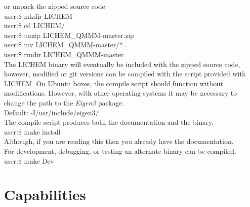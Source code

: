 \documentclass[12pt]{report}
\begin{document}
or unpack the zipped source code \\

user:\$ mkdir LICHEM \\
user:\$ cd LICHEM/ \\
user:\$ unzip LICHEM\_QMMM-master.zip \\
user:\$ mv LICHEM\_QMMM-master/* . \\
user:\$ rmdir LICHEM\_QMMM-master \\

The LICHEM binary will eventually be included with the zipped source code,
however, modified or git versions can be compiled with the script provided
with LICHEM. On Ubuntu boxes, the compile script should function without
modifications. However, with other operating systems it may be necessary to
change the path to the \textit{Eigen3} package. \\

Default: -I/usr/include/eigen3/ \\

The compile script produces both the documentation and the binary. \\

user:\$ make install \\

Although, if you are reading this then you already have the documentation. \\

For development, debugging, or testing an alternate binary can be compiled. \\

user:\$ make Dev

\section{Capabilities}
\end{document}
